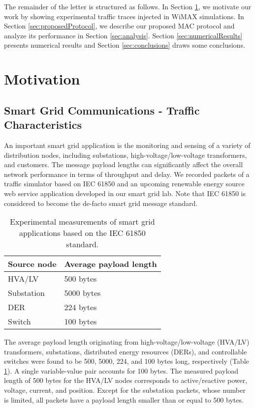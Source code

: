 \documentclass[journal,10pt,draftclsnofoot,onecolumn]{IEEEtran}
\begin{document}
The remainder of the letter is structured as follows. In Section \ref{sec:motivation}, we motivate our work by showing experimental traffic traces injected in WiMAX simulations. In Section \ref{sec:proposedProtocol}, we describe our proposed MAC protocol and analyze its performance in Section \ref{sec:analysis}. Section \ref{sec:numericalResults} presents numerical results and Section \ref{sec:conclusions} draws some conclusions.

\section{Motivation}
\label{sec:motivation}
\subsection{Smart Grid Communications - Traffic Characteristics}
An important smart grid application is the monitoring and sensing of a variety of distribution nodes, including substations, high-voltage/low-voltage transformers, and customers. The message payload lengths can significantly affect the overall network performance in terms of throughput and delay. We recorded packets of a traffic simulator based on IEC 61850 and an upcoming renewable energy source web service application developed in our smart grid lab. Note that IEC 61850 is considered to become the de-facto smart grid message standard.

\begin{table}
\caption{Experimental measurements of smart grid applications based on the IEC 61850 standard.}
\label{table:messageConfigurations}
\begin{center}
{\renewcommand{\arraystretch}{1.2}
    \begin{tabular}{ | l | l |}
    \hline
    Source node & Average payload length \\ \hline
	HVA/LV & 500 bytes \\\hline
	Substation & 5000 bytes \\\hline
	DER & 224 bytes \\\hline
	Switch & 100 bytes \\\hline
    \end{tabular}
}
\end{center}
\end{table}

The average payload length originating from high-voltage/low-voltage (HVA/LV) transformers, substations, distributed energy resources (DERs), and controllable switches were found to be 500, 5000, 224, and 100 bytes long, respectively (Table \ref{table:messageConfigurations}). A single variable-value pair accounts for 100 bytes. The measured payload length of 500 bytes for the HVA/LV nodes corresponds to active/reactive power, voltage, current, and position. Except for the substation packets, whose number is limited, all packets have a payload length smaller than or equal to 500 bytes.
\end{document}
